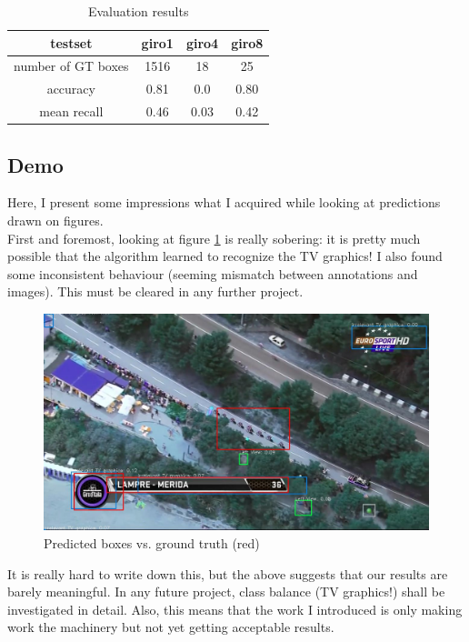 \documentclass{article}
\begin{document}
\begin{table}[h]
    \centering
    \begin{tabular}{|c|c|c|c|} \hline
       testset  & \textbf{giro1} & \textbf{giro4} & \textbf{giro8} \\ \hline
        number of GT boxes  & 1516 & 18 & 25 \\ \hline
        accuracy &  0.81 & 0.0 & 0.80 \\ \hline
        mean recall & 0.46 & 0.03 & 0.42 \\ \hline
        \end{tabular}
        \vspace{10pt}
    \caption{Evaluation results}
    \label{tab:data}
\end{table}

\subsection{Demo}

Here, I present some impressions what I acquired while looking at predictions drawn on figures.\\

First and foremost, looking at figure \ref{fig:pred} is really sobering: it is pretty much possible that the algorithm learned to recognize the TV graphics! I also found some inconsistent behaviour (seeming mismatch between annotations and images). This must be cleared in any further project.
 
\begin{figure}[h]
    \centering
    \includegraphics[scale=0.32]{pred_giro1_1336.jpg}
    \caption{Predicted boxes vs. ground truth (red)}
    \label{fig:pred}
\end{figure}

It is really hard to write down this, but the above suggests that our results are barely meaningful. In any future project, class balance (TV graphics!) shall be investigated in detail. Also, this means that the work I introduced is only making work the machinery but not yet getting acceptable results.
\end{document}

